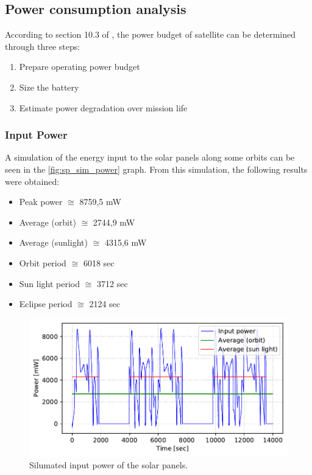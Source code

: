 \subsection{Power consumption analysis}

According to section 10.3 of \cite{larson2005}, the power budget of satellite can be determined through three steps:

\begin{enumerate}
    \item Prepare operating power budget
    \item Size the battery
    \item Estimate power degradation over mission life
\end{enumerate}

\subsubsection{Input Power}

A simulation of the energy input to the solar panels along some orbits can be seen in the \autoref{fig:sp_sim_power} graph. From this simulation, the following results were obtained:

\begin{itemize}
    \item Peak power $\cong$ 8759,5 mW
    \item Average (orbit) $\cong$ 2744,9 mW
    \item Average (sunlight) $\cong$ 4315,6 mW
    \item Orbit period $\cong$ 6018 sec
    \item Sun light period $\cong$ 3712 sec
    \item Eclipse period $\cong$ 2124 sec
\end{itemize}

\begin{figure}[!ht]
    \begin{center}
        \includegraphics[width=\columnwidth]{curves/sp_sim_power}
        \caption{Silumated input power of the solar panels.}
        \label{fig:sp_sim_power}
    \end{center}
\end{figure}

